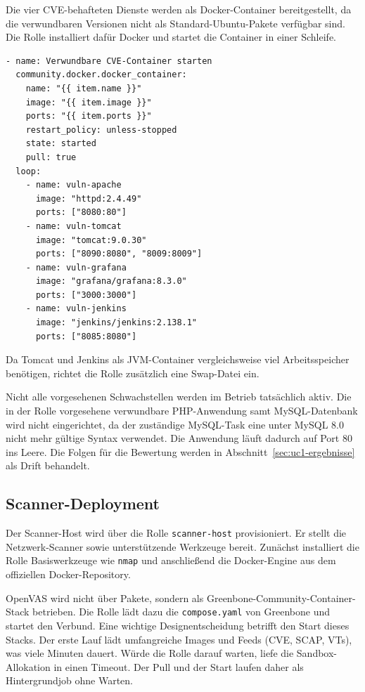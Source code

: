 Die vier CVE-behafteten Dienste werden als Docker-Container bereitgestellt, da die verwundbaren
Versionen nicht als Standard-Ubuntu-Pakete verfügbar sind. Die Rolle installiert dafür Docker und
startet die Container in einer Schleife.

\begin{verbatim}
- name: Verwundbare CVE-Container starten
  community.docker.docker_container:
    name: "{{ item.name }}"
    image: "{{ item.image }}"
    ports: "{{ item.ports }}"
    restart_policy: unless-stopped
    state: started
    pull: true
  loop:
    - name: vuln-apache
      image: "httpd:2.4.49"
      ports: ["8080:80"]
    - name: vuln-tomcat
      image: "tomcat:9.0.30"
      ports: ["8090:8080", "8009:8009"]
    - name: vuln-grafana
      image: "grafana/grafana:8.3.0"
      ports: ["3000:3000"]
    - name: vuln-jenkins
      image: "jenkins/jenkins:2.138.1"
      ports: ["8085:8080"]
\end{verbatim}

Da Tomcat und Jenkins als JVM-Container vergleichsweise viel Arbeitsspeicher benötigen, richtet die
Rolle zusätzlich eine Swap-Datei ein.

Nicht alle vorgesehenen Schwachstellen werden im Betrieb tatsächlich aktiv. Die in der Rolle
vorgesehene verwundbare PHP-Anwendung samt MySQL-Datenbank wird nicht eingerichtet, da der zuständige
MySQL-Task eine unter MySQL 8.0 nicht mehr gültige Syntax verwendet. Die Anwendung läuft dadurch auf
Port 80 ins Leere. Die Folgen für die Bewertung werden in Abschnitt~\ref{sec:uc1-ergebnisse} als
Drift behandelt.


\subsection{Scanner-Deployment}
\label{subsec:uc1-scanner-aufbau}

Der Scanner-Host wird über die Rolle \texttt{scanner-host} provisioniert. Er stellt die
Netzwerk-Scanner sowie unterstützende Werkzeuge bereit. Zunächst installiert die Rolle
Basiswerkzeuge wie \texttt{nmap} und anschließend die Docker-Engine aus dem offiziellen
Docker-Repository.

OpenVAS wird nicht über Pakete, sondern als Greenbone-Community-Container-Stack betrieben. Die Rolle
lädt dazu die \texttt{compose.yaml} von Greenbone und startet den Verbund. Eine wichtige
Designentscheidung betrifft den Start dieses Stacks. Der erste Lauf lädt umfangreiche Images und
Feeds (CVE, SCAP, VTs), was viele Minuten dauert. Würde die Rolle darauf warten, liefe die
Sandbox-Allokation in einen Timeout. Der Pull und der Start laufen daher als Hintergrundjob ohne
Warten.

